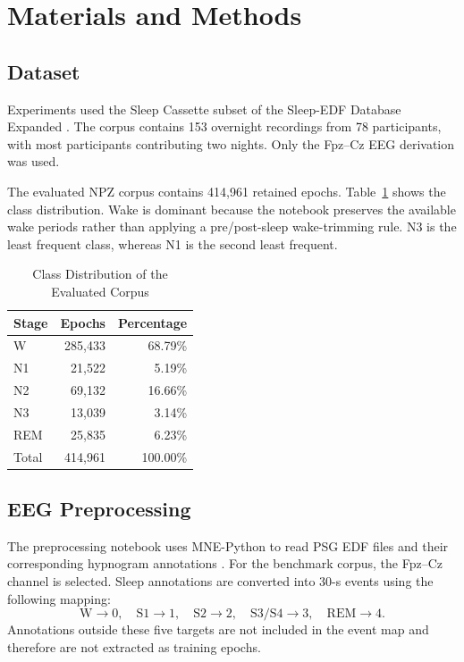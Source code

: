 \documentclass[conference]{IEEEtran}
\begin{document}
\section{Materials and Methods}

\subsection{Dataset}

Experiments used the Sleep Cassette subset of the Sleep-EDF Database Expanded \cite{sleepedfx_dataset,kemp2000analysis}. The corpus contains 153 overnight recordings from 78 participants, with most participants contributing two nights. Only the Fpz--Cz EEG derivation was used.

The evaluated NPZ corpus contains 414,961 retained epochs. Table~\ref{tab:distribution} shows the class distribution. Wake is dominant because the notebook preserves the available wake periods rather than applying a pre/post-sleep wake-trimming rule. N3 is the least frequent class, whereas N1 is the second least frequent.
\begin{table}[H]
\centering
\caption{Class Distribution of the Evaluated Corpus}
\label{tab:distribution}
\begin{tabular}{lrr}
\toprule
Stage & Epochs & Percentage \\
\midrule
W   & 285,433 & 68.79\% \\
N1  & 21,522  & 5.19\% \\
N2  & 69,132  & 16.66\% \\
N3  & 13,039  & 3.14\% \\
REM & 25,835  & 6.23\% \\
\midrule
Total & 414,961 & 100.00\% \\
\bottomrule
\end{tabular}
\end{table}

\subsection{EEG Preprocessing}

The preprocessing notebook uses MNE-Python to read PSG EDF files and their corresponding hypnogram annotations \cite{gramfort2014mne}. For the benchmark corpus, the Fpz--Cz channel is selected. Sleep annotations are converted into 30-s events using the following mapping:
\begin{equation}
\mathrm{W}\rightarrow0,\quad
\mathrm{S1}\rightarrow1,\quad
\mathrm{S2}\rightarrow2,\quad
\mathrm{S3/S4}\rightarrow3,\quad
\mathrm{REM}\rightarrow4.
\end{equation}
Annotations outside these five targets are not included in the event map and therefore are not extracted as training epochs.
\end{document}
